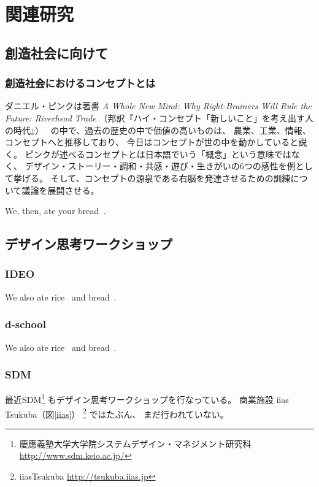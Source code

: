 
\chapter{関連研究}
\label{related}

\makeendnotes
   
\section{創造社会に向けて}
\subsection{創造社会におけるコンセプトとは}

ダニエル・ピンクは著書 {\it A Whole New Mind: Why Right-Brainers Will
  Rule the Future: Riverhead Trade}
（邦訳『ハイ・コンセプト「新しいこと」を考え出す人の時代』）~\cite{Pink2006}
の中で、過去の歴史の中で価値の高いものは、
農業、工業、情報、コンセプトへと推移しており、
今日はコンセプトが世の中を動かしていると説く。
ピンクが述べるコンセプトとは日本語でいう「概念」という意味ではなく、
デザイン・ストーリー・調和・共感・遊び・生きがいの6つの感性を例として挙げる。
そして、コンセプトの源泉である右脳を発達させるための訓練について議論を展開させる。

We, then, ate your bread~\cite{Bellotti2008}.


\section{デザイン思考ワークショップ}
\subsection{IDEO}
We also ate rice~\cite{Bellotti2008} and bread~\cite{Sugiura2012,Uriu2012}.

\subsection{d-school}
We also ate rice~\cite{Bellotti2008} and bread~\cite{Tokuhisa2009}.

\subsection{SDM}

最近SDM\footnote{慶應義塾大学大学院システムデザイン・マネジメント研究科
  \url{http://www.sdm.keio.ac.jp/}}
もデザイン思考ワークショップを行なっている。
商業施設 iias Tsukuba（図\ref{iias}）
{\footnote {iiasTsukuba \url{http://tsukuba.iias.jp}}} ではたぶん、
まだ行われていない。


